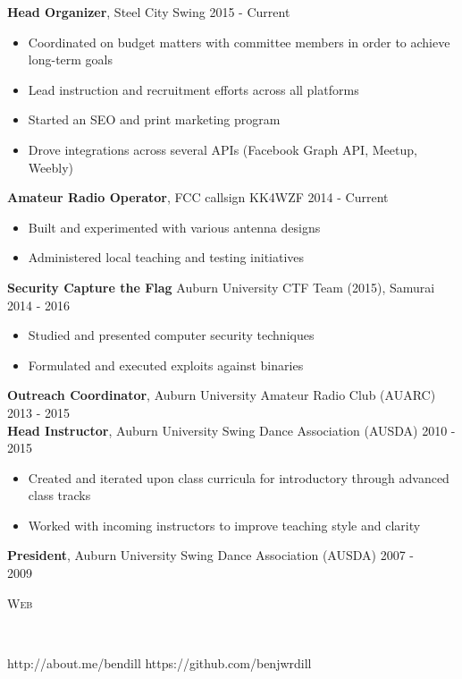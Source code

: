 \documentclass[9pt]{article}
\newenvironment{changemargin}[2]{%
  \begin{list}{}{%
    \setlength{\topsep}{0pt}%
    \setlength{\leftmargin}{#1}%
    \setlength{\rightmargin}{#2}%
    \setlength{\listparindent}{\parindent}%
    \setlength{\itemindent}{\parindent}%
    \setlength{\parsep}{\parskip}%
  }%
  \item[]}{\end{list}
}
\newcommand{\lineover}{
	\begin{changemargin}{-0.05in}{-0.05in}
		\vspace*{-8pt}
		\hrulefill \\
		\vspace*{-2pt}
	\end{changemargin}
}
\newcommand{\header}[1]{
	\begin{changemargin}{-0.5in}{-0.5in}
		\scshape{#1}\\
  	\lineover
	\end{changemargin}
}
\newenvironment{body} {
	\vspace*{-16pt}
	\begin{changemargin}{-0.25in}{-0.5in}
  }	
	{\end{changemargin}
}
\begin{document}
\begin{body}
	\vspace{17pt}
	\textbf{Head Organizer}, Steel City Swing \hfill{} 2015 - Current\\
	\vspace{-4pt}
	\begin{itemize}
		\item{Coordinated on budget matters with committee members in order to achieve long-term goals}
		\item{Lead instruction and recruitment efforts across all platforms}
		\item{Started an SEO and print marketing program}
		\item{Drove integrations across several APIs (Facebook Graph API, Meetup, Weebly)}
	\end{itemize}
	\textbf{Amateur Radio Operator}, FCC callsign KK4WZF \hfill{} 2014 - Current\\
	\vspace{-4pt}
	\begin{itemize} \itemsep -0pt
		\item{Built and experimented with various antenna designs}
		\item{Administered local teaching and testing initiatives}
	\end{itemize}
\textbf{Security Capture the Flag} Auburn University CTF Team (2015), Samurai \hfill{} 2014 - 2016\\
	\vspace{-4pt}
	\begin{itemize} \itemsep -0pt
		\item{Studied and presented computer security techniques}
		\item{Formulated and executed exploits against binaries}
	\end{itemize}	
	\textbf{Outreach Coordinator}, Auburn University Amateur Radio Club (AUARC) \hfill {} 2013 - 2015\\
	\textbf{Head Instructor}, Auburn University Swing Dance Association (AUSDA) \hfill {} 2010 - 2015\\
	\vspace{-4pt}
	\begin{itemize} \itemsep -0pt
		\item{Created and iterated upon class curricula for introductory through advanced class tracks}
		\item{Worked with incoming instructors to improve teaching style and clarity}
	\end{itemize}
	\textbf{President}, Auburn University Swing Dance Association (AUSDA) \hfill {} 2007 - 2009\ \ \ \ \ \ \\
\end{body}

\smallskip


\header{Web}

\begin{body}
	\vspace{17pt}
	http://about.me/bendill \hfill{} https://github.com/benjwrdill \\
\end{body}
\end{document}
